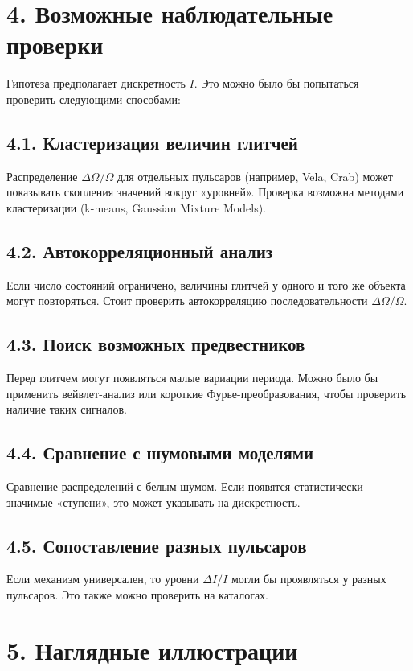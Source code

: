 \documentclass[a4paper,12pt]{article}
\begin{document}
\section*{4. Возможные наблюдательные проверки}
Гипотеза предполагает дискретность $I$. Это можно было бы попытаться проверить следующими способами:

\subsection*{4.1. Кластеризация величин глитчей}
Распределение $\Delta \Omega / \Omega$ для отдельных пульсаров (например, Vela, Crab) может показывать скопления значений вокруг «уровней». Проверка возможна методами кластеризации (k-means, Gaussian Mixture Models).

\subsection*{4.2. Автокорреляционный анализ}
Если число состояний ограничено, величины глитчей у одного и того же объекта могут повторяться. Стоит проверить автокорреляцию последовательности $\Delta \Omega / \Omega$.

\subsection*{4.3. Поиск возможных предвестников}
Перед глитчем могут появляться малые вариации периода. Можно было бы применить вейвлет-анализ или короткие Фурье-преобразования, чтобы проверить наличие таких сигналов.

\subsection*{4.4. Сравнение с шумовыми моделями}
Сравнение распределений с белым шумом. Если появятся статистически значимые «ступени», это может указывать на дискретность.

\subsection*{4.5. Сопоставление разных пульсаров}
Если механизм универсален, то уровни $\Delta I/I$ могли бы проявляться у разных пульсаров. Это также можно проверить на каталогах.

\section*{5. Наглядные иллюстрации}
\end{document}
